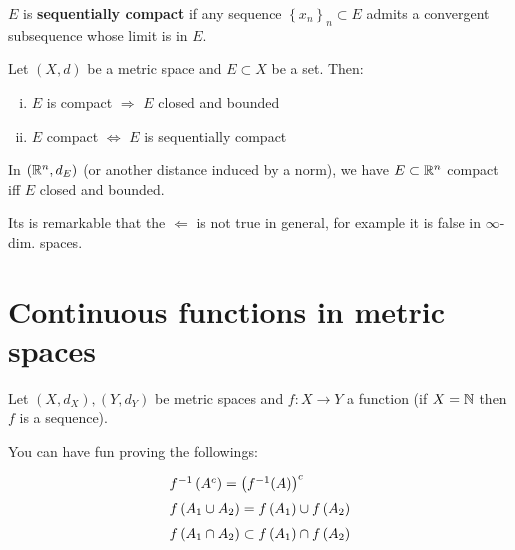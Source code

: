 \begin{defn}
$E$ is \textbf{sequentially compact} if any sequence $\left\{ x_n \right\}_n\subset E$ admits a convergent subsequence whose limit is in $E$.
\end{defn}

\begin{thm}
Let $(X,d)$ be a metric space and $E\subset X$ be a set. Then:
\begin{enumerate}[(i)]
    \item $E$ is compact $\Longrightarrow$ $E$ closed and bounded
    \item $E$ compact $\Longleftrightarrow$ $E$ is sequentially compact
\end{enumerate}
\end{thm}

\begin{thm}
In $\left( \mathbb{R}^n,d_E \right)$ (or another distance induced by a norm), we have $E\subset\mathbb{R}^n$ compact iff $E$ closed and bounded.
\end{thm}

Its is remarkable that the $\Longleftarrow$ is not true in general, for example it is false in $\infty$-dim. spaces.


\newpage

\section{Continuous functions in metric spaces} %
\label{sec:continuous_functions_in_metric_spaces}

Let $\left( X,d_X \right),\left( Y,d_Y \right)$ be metric spaces and $f:X\to Y$ a function (if $X=\mathbb{N}$ then $f$ is a sequence).

\begin{marker}
You can have fun proving the followings:
\begin{equation*}
\left.
{\renewcommand*{\arraystretch}{1.5}
\begin{array}{l}
f^{-1}\left( A^c \right)=\left( f^{-1}(A) \right)^c \\
f\left( A_1\cup A_2 \right)=f\left( A_1 \right)\cup f\left( A_2 \right) \\
f\left( A_1\cap A_2 \right)\subset f\left( A_1 \right)\cap f\left( A_2 \right)
\end{array}}
\right.\end{equation*}
\end{marker}

